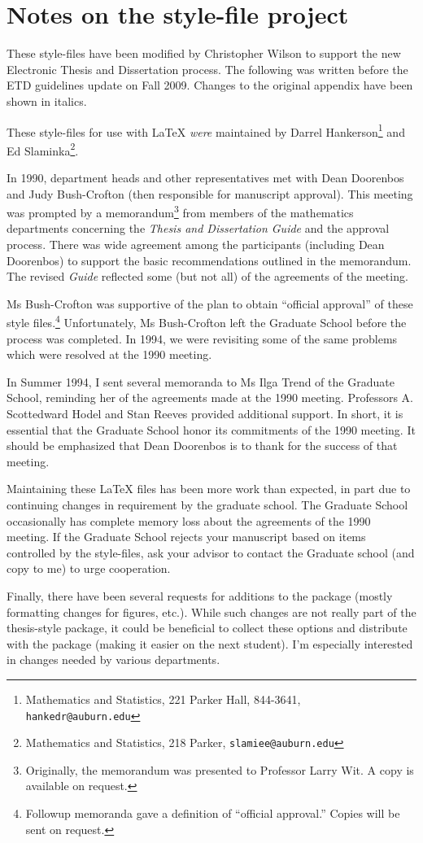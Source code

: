 \documentclass[12pt]{report}
\theoremstyle{plain}
\theoremstyle{definition}
\numberwithin{equation}{section}
\begin{document}
\chapter{Notes on the style-file project}

\begin{singlespace}
These style-files have been modified by Christopher Wilson to support the new Electronic Thesis and Dissertation process. The following was written before the ETD guidelines update on Fall 2009. Changes to the original appendix have been shown in italics. 

These style-files for use with \LaTeX{} {\it were} maintained by Darrel
Hankerson\footnote{Mathematics and Statistics, 221 Parker Hall,
844-3641, {\tt hankedr@auburn.edu}} and Ed
Slaminka\footnote{Mathematics and Statistics, 218 Parker,
{\tt slamiee@auburn.edu}}.

In 1990, department heads and other representatives met with Dean Doorenbos
and Judy Bush-Crofton (then responsible for manuscript approval). This
meeting was prompted by a memorandum\footnote{Originally, the memorandum
was presented to Professor Larry Wit. A copy is available on request.} from
members of the mathematics departments concerning the {\em Thesis and
Dissertation Guide\/} and the approval process. There was wide agreement
among the participants (including Dean Doorenbos) to support the basic
recommendations outlined in the memorandum. The revised {\em Guide\/}
reflected some (but not all) of the agreements of the meeting.

Ms Bush-Crofton was supportive of the plan to obtain ``official approval''
of these style files.\footnote{Followup memoranda gave a definition of
``official approval.'' Copies will be sent on request.}  Unfortunately, Ms
Bush-Crofton left the Graduate School before the process was completed. In
1994, we were revisiting some of the same problems which were
resolved at the 1990 meeting.

In Summer 1994, I sent several memoranda to Ms Ilga Trend of the Graduate
School, reminding her of the agreements made at the 1990 meeting.
Professors A. Scottedward Hodel and Stan Reeves provided additional
support.  In short, it is essential that the Graduate School honor its
commitments of the 1990 meeting. It should be emphasized that Dean
Doorenbos is to thank for the success of that meeting.

Maintaining these \LaTeX{} files has been more work than expected, in
part due to continuing changes in requirement by the graduate school.
The Graduate School occasionally has complete memory loss about the
agreements of the 1990 meeting. If the Graduate School rejects your
manuscript based on items controlled by the style-files, ask
your advisor to contact the Graduate school (and copy to me) to urge
cooperation.

Finally, there have been several requests for additions to the package
(mostly formatting changes for figures, etc.). While such changes are not
really part of the thesis-style package, it could be beneficial to collect
these options and distribute with the package (making it easier on the next
student).  I'm especially interested in changes needed by various
departments.

\end{singlespace}
\end{document}
